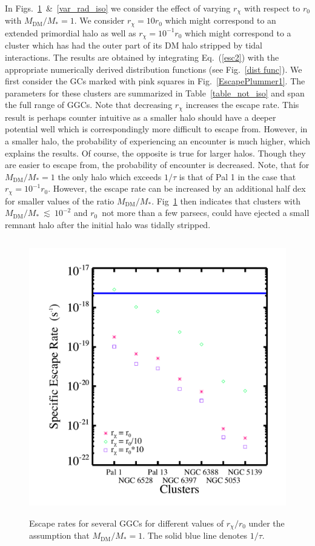 \documentclass[aps,floatfix,prd,showpacs]{revtex4}
\newcommand{\rx}{r_\chi}
\newcommand{\MDM}{M_{\mathrm{DM}}}
\begin{document}
In Figs.~\ref{var_rad_not_iso}~\&~\ref{var_rad_iso} we consider the effect of varying $\rx$ with respect to $r_0$ with $\MDM/M_* = 1$.  We consider $\rx = 10r_0$ which might correspond to an extended primordial halo as well as $\rx = 10^{-1}r_0$ which might correspond to a cluster which has had the outer part of its DM halo stripped by tidal interactions.  The results are obtained by integrating Eq.~(\ref{esc2}) with the appropriate numerically derived distribution functions (see Fig.~\ref{dist func}).  We first consider the GCs marked with pink squares in Fig.~\ref{EscapePlummer1}.  The parameters for these clusters are summarized in Table~\ref{table_not_iso} and span the full range of GGCs.  Note that decreasing $\rx$ increases the escape rate.  This result is perhaps counter intuitive as a smaller halo should have a deeper potential well which is correspondingly more difficult to escape from.  However, in a smaller halo, the probability of experiencing an encounter is much higher, which explains the results.  Of course, the opposite is true for larger halos.  Though they are easier to escape from, the probability of encounter is decreased.  Note, that for $\MDM/M_* = 1$ the only halo which exceeds $1/\tau$ is that of Pal 1 in the case that $\rx = 10^{-1}r_0$.  However, the escape rate can be increased by an additional half dex for smaller values of the ratio $\MDM/M_*$.  Fig~\ref{var_rad_not_iso} then indicates that clusters with $\MDM/M_*~\lesssim~10^{-2}$ and $r_0$~not more than a few parsecs, could have ejected a small remnant halo after the initial halo was tidally stripped.  
%
\begin{figure}[htp]
\centering
\includegraphics[width=12cm, height=12cm]{var_rad_not_iso}
\caption{Escape rates for several GGCs for different values of $\rx/r_0$ under the assumption that $\MDM/M_* = 1$.  The solid blue line denotes $1/\tau$.}  
\label{var_rad_not_iso}
\end{figure}
\end{document}
